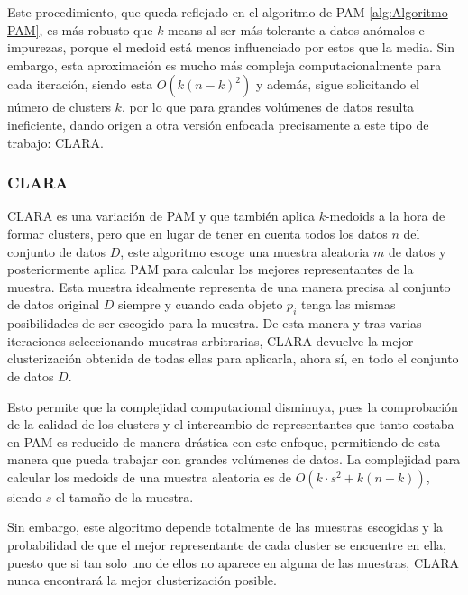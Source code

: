 \documentclass[10pt, a4paper]{article}
\begin{document}
Este procedimiento, que queda reflejado en el algoritmo de PAM \ref{alg:Algoritmo PAM}, es más robusto que $k$-means al ser más tolerante a datos anómalos e impurezas, porque el medoid está menos influenciado por estos que la media. Sin embargo, esta aproximación es mucho más compleja computacionalmente para cada iteración, siendo esta $O \left(k\left(n-k\right)^2\right)$ y además, sigue solicitando el número de clusters $k$, por lo que para grandes volúmenes de datos resulta ineficiente, dando origen a otra versión enfocada precisamente a este tipo de trabajo: CLARA.




\subsubsection{\textbf{CLARA}} \label{clara}

CLARA es una variación de PAM y que también aplica $k$-medoids a la hora de formar clusters, pero que en lugar de tener en cuenta todos los datos $n$ del conjunto de datos $D$, este algoritmo escoge una muestra aleatoria $m$ de datos y posteriormente aplica PAM para calcular los mejores representantes de la muestra. Esta muestra idealmente representa de una manera precisa al conjunto de datos original $D$ siempre y cuando cada objeto $p_i$ tenga las mismas posibilidades de ser escogido para la muestra. De esta manera y tras varias iteraciones seleccionando muestras arbitrarias, CLARA devuelve la mejor clusterización obtenida de todas ellas para aplicarla, ahora sí, en todo el conjunto de datos $D$.

Esto permite que la complejidad computacional disminuya, pues la comprobación de la calidad de los clusters y el intercambio de representantes que tanto costaba en PAM es reducido de manera drástica con este enfoque, permitiendo de esta manera que pueda trabajar con grandes volúmenes de datos. La complejidad para calcular los medoids de una muestra aleatoria es de $O\left(k\cdot s^2 + k\left(n - k \right)\right)$, siendo $s$ el tamaño de la muestra.

Sin embargo, este algoritmo depende totalmente de las muestras escogidas y la probabilidad de que el mejor representante de cada cluster se encuentre en ella, puesto que si tan solo uno de ellos no aparece en alguna de las muestras, CLARA nunca encontrará la mejor clusterización posible. 
\end{document}
